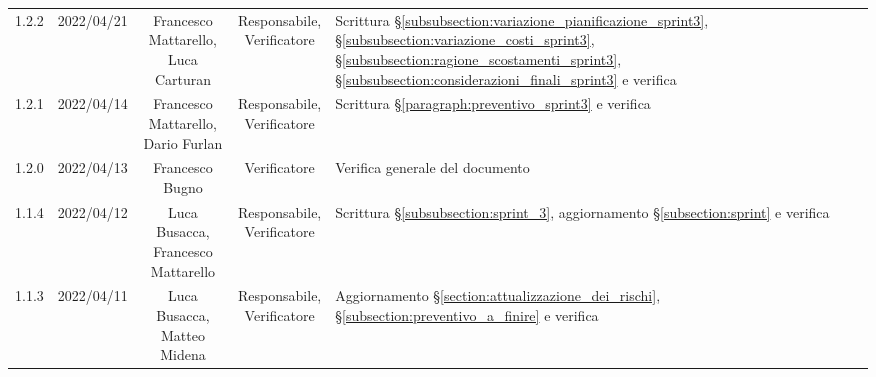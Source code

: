 \begin{center}
\begin{longtable}[c]{c | c | c | c | p{5cm}}
		1.2.2                                                      & 2022/04/21 & \Shortunderstack{Francesco Mattarello,                                                                                                                                                              \\Luca Carturan} & \Shortunderstack{Responsabile,\\Verificatore} & Scrittura §\ref{subsubsection:variazione_pianificazione_sprint3}, §\ref{subsubsection:variazione_costi_sprint3}, §\ref{subsubsection:ragione_scostamenti_sprint3}, §\ref{subsubsection:considerazioni_finali_sprint3} e verifica\\
		1.2.1                                                      & 2022/04/14 & \Shortunderstack{Francesco Mattarello,                                                                                                                                                              \\Dario Furlan} & \Shortunderstack{Responsabile,\\Verificatore} & Scrittura §\ref{paragraph:preventivo_sprint3} e verifica\\
		1.2.0                                                      & 2022/04/13 & Francesco Bugno                        & Verificatore   & Verifica generale del documento                                                                                                           \\
		1.1.4                                                      & 2022/04/12 & \Shortunderstack{Luca Busacca,                                                                                                                                                                      \\Francesco Mattarello} & \Shortunderstack{Responsabile,\\Verificatore} & Scrittura §\ref{subsubsection:sprint_3}, aggiornamento §\ref{subsection:sprint} e verifica\\
		1.1.3                                                      & 2022/04/11 & \Shortunderstack{Luca Busacca,                                                                                                                                                                      \\Matteo Midena} & \Shortunderstack{Responsabile,\\Verificatore} & Aggiornamento §\ref{section:attualizzazione_dei_rischi}, §\ref{subsection:preventivo_a_finire} e verifica\\

\end{longtable}
\end{center}
